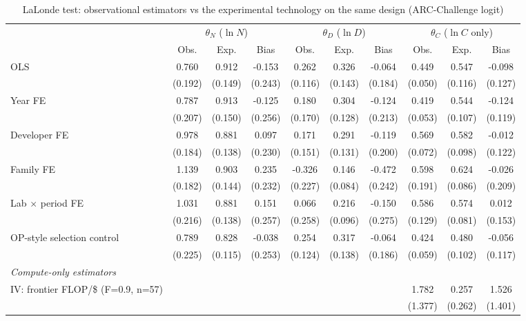 \begin{table}[!htbp]
\centering
\scriptsize
\begin{threeparttable}
\caption{LaLonde test: observational estimators vs the experimental technology on the same design (ARC-Challenge logit)}
\label{tab:table6_lalonde_arc}
\begin{tabular}{lccccccccc}
\toprule
\multicolumn{1}{c}{} & \multicolumn{3}{c}{$\theta_N$ ($\ln N$)} & \multicolumn{3}{c}{$\theta_D$ ($\ln D$)} & \multicolumn{3}{c}{$\theta_C$ ($\ln C$ only)} \\ \cmidrule(lr){2-4}\cmidrule(lr){5-7}\cmidrule(lr){8-10}
 & Obs. & Exp. & Bias & Obs. & Exp. & Bias & Obs. & Exp. & Bias \\
\midrule
OLS & 0.760 & 0.912 & -0.153 & 0.262 & 0.326 & -0.064 & 0.449 & 0.547 & -0.098 \\
 & (0.192) & (0.149) & (0.243) & (0.116) & (0.143) & (0.184) & (0.050) & (0.116) & (0.127) \\
Year FE & 0.787 & 0.913 & -0.125 & 0.180 & 0.304 & -0.124 & 0.419 & 0.544 & -0.124 \\
 & (0.207) & (0.150) & (0.256) & (0.170) & (0.128) & (0.213) & (0.053) & (0.107) & (0.119) \\
Developer FE & 0.978 & 0.881 & 0.097 & 0.171 & 0.291 & -0.119 & 0.569 & 0.582 & -0.012 \\
 & (0.184) & (0.138) & (0.230) & (0.151) & (0.131) & (0.200) & (0.072) & (0.098) & (0.122) \\
Family FE & 1.139 & 0.903 & 0.235 & -0.326 & 0.146 & -0.472 & 0.598 & 0.624 & -0.026 \\
 & (0.182) & (0.144) & (0.232) & (0.227) & (0.084) & (0.242) & (0.191) & (0.086) & (0.209) \\
Lab $\times$ period FE & 1.031 & 0.881 & 0.151 & 0.066 & 0.216 & -0.150 & 0.586 & 0.574 & 0.012 \\
 & (0.216) & (0.138) & (0.257) & (0.258) & (0.096) & (0.275) & (0.129) & (0.081) & (0.153) \\
OP-style selection control & 0.789 & 0.828 & -0.038 & 0.254 & 0.317 & -0.064 & 0.424 & 0.480 & -0.056 \\
 & (0.225) & (0.115) & (0.253) & (0.124) & (0.138) & (0.186) & (0.059) & (0.102) & (0.117) \\
\midrule
\multicolumn{10}{l}{\textit{Compute-only estimators}} \\
IV: frontier FLOP/\$ (F=0.9, n=57) &  &  &  &  &  &  & 1.782 & 0.257 & 1.526 \\
 &  &  &  &  &  &  & (1.377) & (0.262) & (1.401) \\

\end{tabular}
\end{threeparttable}
\end{table}
